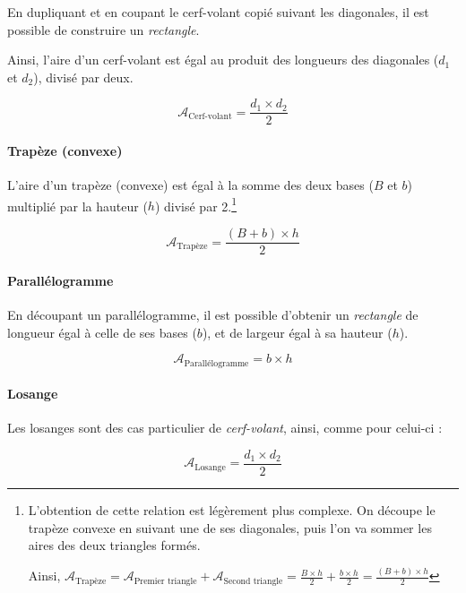 \documentclass[a4paper, twoside]{article}
\begin{document}
En dupliquant et en coupant le cerf-volant copié suivant les diagonales,
il est possible de construire un \textit{rectangle}.

Ainsi, l'aire d'un cerf-volant est égal au produit des longueurs
des diagonales ($d_{1}$ et $d_{2}$), divisé par deux.

$$\mathcal{A}_{\text{Cerf-volant}} = \frac{ d_{1} \times d_{2} }{ 2 }$$

\vspace*{-0.25cm}

\paragraph*{Trapèze (convexe)}

L'aire d'un trapèze (convexe) est égal à la somme des
deux bases ($B$ et $b$) multiplié par la hauteur ($h$) divisé par 2.\footnote{
	L'obtention de cette relation est légèrement plus complexe.
	On découpe le trapèze convexe en suivant une de ses diagonales,
	puis l'on va sommer les aires des deux triangles formés.

	Ainsi, $\mathcal{A}_{\text{Trapèze}} = \mathcal{A}_{\text{Premier triangle}} + \mathcal{A}_{\text{Second triangle}} = \frac{B \times h}{2} + \frac{b \times h}{2} = \frac {(B+b) \times h}{2}$
}

$$\mathcal{A}_{\text{Trapèze}} = \frac {(B+b) \times h}{2}$$

\vspace*{-0.25cm}

\paragraph*{Parallélogramme}

En découpant un parallélogramme,
il est possible d'obtenir un \textit{rectangle} de longueur égal à celle de ses bases ($b$),
et de largeur égal à sa hauteur ($h$).

$$\mathcal{A}_{\text{Parallélogramme}} = b \times h$$

\vspace*{-0.25cm}

\paragraph*{Losange}

Les losanges sont des cas particulier de \textit{cerf-volant},
ainsi, comme pour celui-ci :

$$\mathcal{A}_{\text{Losange}} = \frac{ d_{1} \times d_{2} }{ 2 }$$
\end{document}
